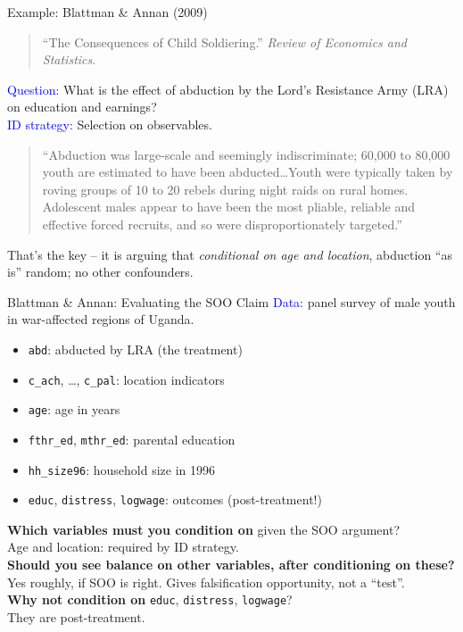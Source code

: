 \documentclass[xcolor=dvipsnames]{beamer}
\begin{document}
\begin{frame}{Example: Blattman \& Annan (2009)}
\small
\begin{quote}
\footnotesize
``The Consequences of Child Soldiering.'' \textit{Review of Economics and Statistics}.
\end{quote}

\medskip
{} \textcolor{Blue}{Question}: What is the effect of abduction by the Lord's Resistance Army (LRA) on education and earnings?\\

\bigskip
{} \textcolor{Blue}{ID strategy}: Selection on observables.\\
\footnotesize
\begin{quote}
``Abduction was large-scale and seemingly indiscriminate; 60,000 to 80,000 youth are estimated to have been abducted\ldots Youth were typically taken by roving groups of 10 to 20 rebels during night raids on rural homes. Adolescent males appear to have been the most pliable, reliable and effective forced recruits, and so were disproportionately targeted.''
\end{quote}

\small
{} That's the key -- it is arguing that \textit{conditional on age and location}, abduction ``as is'' random; no other confounders. 
\end{frame}


\begin{frame}{Blattman \& Annan: Evaluating the SOO Claim}
\small
{} \textcolor{Blue}{Data}: panel survey of male youth in war-affected regions of Uganda.\\
\footnotesize
\begin{itemize}
\item \texttt{abd}: abducted by LRA (the treatment)
\item \texttt{c\_ach}, \ldots, \texttt{c\_pal}: location indicators
\item \texttt{age}: age in years
\item \texttt{fthr\_ed}, \texttt{mthr\_ed}: parental education
\item \texttt{hh\_size96}: household size in 1996
\item \texttt{educ}, \texttt{distress}, \texttt{logwage}: outcomes (post-treatment!)
\end{itemize}

\medskip
\small
{} \textbf{Which variables must you condition on} given the SOO argument?\\
 \footnotesize Age and location: required by ID strategy.\\

\medskip
\small
{} \textbf{Should you see balance on other variables, after conditioning on these?}\\
 \footnotesize Yes roughly, if SOO is right. Gives falsification opportunity, not a ``test''.\\

\medskip
\small
{} \textbf{Why not condition on} \texttt{educ}, \texttt{distress}, \texttt{logwage}?\\
 \footnotesize They are post-treatment. 
\end{frame}
\end{document}
